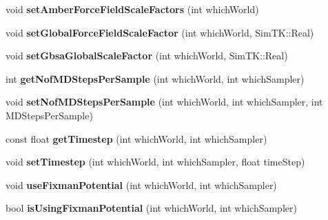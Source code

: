 \begin{DoxyCompactItemize}
\item 
void {\bfseries set\+Amber\+Force\+Field\+Scale\+Factors} (int which\+World)\hypertarget{classContext_a6005c1dea1595627cf11a72d9fbe5178}{}\label{classContext_a6005c1dea1595627cf11a72d9fbe5178}

\item 
void {\bfseries set\+Global\+Force\+Field\+Scale\+Factor} (int which\+World, Sim\+T\+K\+::\+Real)\hypertarget{classContext_ab6bcb997cdd1aec798d9018692afcd27}{}\label{classContext_ab6bcb997cdd1aec798d9018692afcd27}

\item 
void {\bfseries set\+Gbsa\+Global\+Scale\+Factor} (int which\+World, Sim\+T\+K\+::\+Real)\hypertarget{classContext_aa1d216cc40b9dcfde36652a965e56f05}{}\label{classContext_aa1d216cc40b9dcfde36652a965e56f05}

\item 
int {\bfseries get\+Nof\+M\+D\+Steps\+Per\+Sample} (int which\+World, int which\+Sampler)\hypertarget{classContext_aed9b2985cdc6ae1201f0c4b473c6c0e0}{}\label{classContext_aed9b2985cdc6ae1201f0c4b473c6c0e0}

\item 
void {\bfseries set\+Nof\+M\+D\+Steps\+Per\+Sample} (int which\+World, int which\+Sampler, int M\+D\+Steps\+Per\+Sample)\hypertarget{classContext_a3fd9b856887ed4e85ab79c9dfc18220f}{}\label{classContext_a3fd9b856887ed4e85ab79c9dfc18220f}

\item 
const float {\bfseries get\+Timestep} (int which\+World, int which\+Sampler)\hypertarget{classContext_ad21f2aaeda92692ef1b33e974ff85295}{}\label{classContext_ad21f2aaeda92692ef1b33e974ff85295}

\item 
void {\bfseries set\+Timestep} (int which\+World, int which\+Sampler, float time\+Step)\hypertarget{classContext_a82b6fd848de84eaa1a214016cc171942}{}\label{classContext_a82b6fd848de84eaa1a214016cc171942}

\item 
void {\bfseries use\+Fixman\+Potential} (int which\+World, int which\+Sampler)\hypertarget{classContext_ac6eceed7cf476ec4dd14755bc39f0561}{}\label{classContext_ac6eceed7cf476ec4dd14755bc39f0561}

\item 
bool {\bfseries is\+Using\+Fixman\+Potential} (int which\+World, int which\+Sampler)\hypertarget{classContext_a41b54fb16e7028c4c4c1a9502d19a2fd}{}\label{classContext_a41b54fb16e7028c4c4c1a9502d19a2fd}


\end{DoxyCompactItemize}
